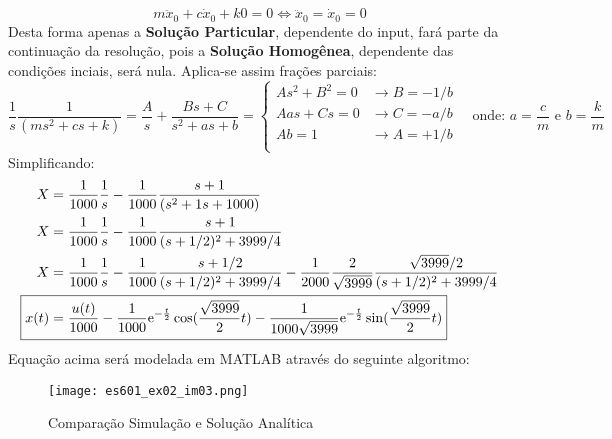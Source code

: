 \documentclass{article}
\begin{document}
\begin{resolution}
                    \begin{equation*}
                        m\ddot{x}_{0} + c\dot{x}_{0} + k0 = 0
                        \iff
                        \boxed{\ddot{x}_{0} = \dot{x}_{0} = 0}
                    \end{equation*}
                Desta forma apenas a \textbf{Solução Particular}, dependente do input, fará parte da continuação da resolução, pois a \textbf{Solução Homogênea}, dependente das condições inciais, será nula. Aplica-se assim frações parciais:
                    \begin{equation*}
                        \frac{1}{s}\frac{1}{(ms^2 + cs + k)} =
                        \frac{A}{s} + \frac{Bs + C}{s^2 + as + b} = 
                        \begin{cases}
                            As^2 + B^2 = 0  &\rightarrow\boxed{B = -1/b}\\
                            Aas + Cs = 0    &\rightarrow\boxed{C = -a/b}\\
                            Ab = 1          &\rightarrow\boxed{A = +1/b}\\
                        \end{cases}
                        \quad
                        \text{onde: $a = \frac{c}{m}$ e $b = \frac{k}{m}$}
                    \end{equation*}
                Simplificando:
                    \begin{align}
                        X &= \frac{1}{1000}\frac{1}{s} - \frac{1}{1000}\frac{s+1}{(s^2 + 1s + 1000)}\nonumber\\
                        X &= \frac{1}{1000}\frac{1}{s} - \frac{1}{1000}\frac{s+1}{(s + 1/2)^2 + 3999/4}\nonumber\\
                        X &= \frac{1}{1000}\frac{1}{s} - \frac{1}{1000}\frac{s+1/2}{(s + 1/2)^2 + 3999/4} - \frac{1}{2000}\frac{2}{\sqrt{3999}}\frac{\sqrt{3999}/2}{(s + 1/2)^2 + 3999/4}\\
                        \Aboxed{x(t) &= \frac{u(t)}{1000} - \frac{1}{1000}\text{e}^{-\frac{t}{2}}\cos(\frac{\sqrt{3999}}{2}t) - \frac{1}{1000\sqrt{3999}}\text{e}^{-\frac{t}{2}}\sin(\frac{\sqrt{3999}}{2}t)}
                    \end{align}
                Equação acima será modelada em MATLAB através do seguinte algoritmo:
                    \begin{scriptsize}
                        \myOctave
                        
                    \end{scriptsize}
                    \begin{figure}[H]
                        \centering
                        \texttt{[image: es601\_ex02\_im03.png]}
                        \caption{Comparação Simulação e Solução Analítica}
                    \end{figure}
            \end{resolution}
\end{document}
